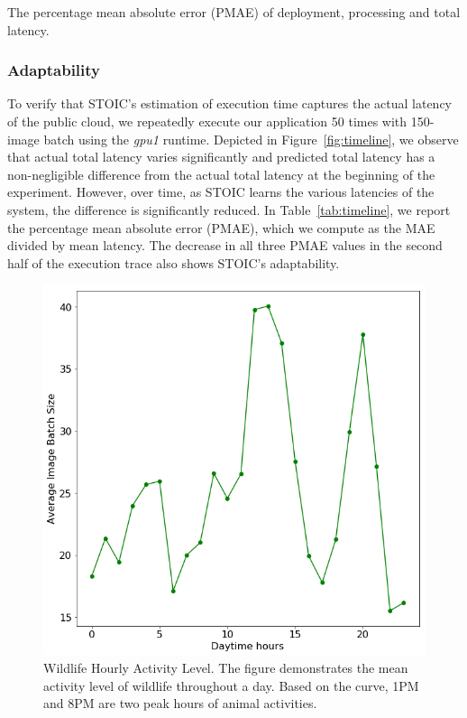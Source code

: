 \begin{table}
\centering

\caption{The percentage mean absolute error (PMAE) of deployment, processing and total latency.  \label{tab:timeline}}
\end{table}
 
 \subsubsection{Adaptability}
 
To verify that STOIC's estimation of execution time captures the actual latency of the public cloud, we repeatedly execute our application 50 times with 150-image batch using the \textit{gpu1} runtime. Depicted in Figure~\ref{fig:timeline}, we observe that actual total latency varies significantly and predicted total latency has a non-negligible difference from the actual total latency at the beginning of the experiment. However, over time, as STOIC learns the various latencies of the system, the difference is significantly reduced. In Table~\ref{tab:timeline}, we report the percentage mean absolute error (PMAE), which we compute as the MAE divided by mean latency. The decrease in all three PMAE values in the second half of the execution trace also shows STOIC's adaptability.

\begin{figure}[t] \centering 
\includegraphics[scale=0.36]{figures/Hourly_act.png}
\caption{Wildlife Hourly Activity Level. The figure demonstrates the mean activity level of wildlife throughout a day. Based on the curve, 1PM and 8PM are two peak hours of animal activities.
\label{fig:hour_act}}
\end{figure} 
 
